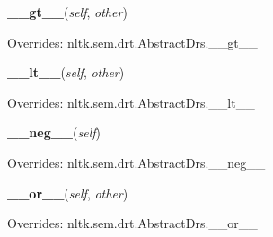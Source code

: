     \vspace{0.5ex}

\hspace{.8\funcindent}\begin{boxedminipage}{\funcwidth}

    \raggedright \textbf{\_\_gt\_\_}(\textit{self}, \textit{other})

\setlength{\parskip}{2ex}
\setlength{\parskip}{1ex}
      Overrides: nltk.sem.drt.AbstractDrs.\_\_gt\_\_

    \end{boxedminipage}

    \vspace{0.5ex}

\hspace{.8\funcindent}\begin{boxedminipage}{\funcwidth}

    \raggedright \textbf{\_\_lt\_\_}(\textit{self}, \textit{other})

\setlength{\parskip}{2ex}
\setlength{\parskip}{1ex}
      Overrides: nltk.sem.drt.AbstractDrs.\_\_lt\_\_

    \end{boxedminipage}

    \vspace{0.5ex}

\hspace{.8\funcindent}\begin{boxedminipage}{\funcwidth}

    \raggedright \textbf{\_\_neg\_\_}(\textit{self})

\setlength{\parskip}{2ex}
\setlength{\parskip}{1ex}
      Overrides: nltk.sem.drt.AbstractDrs.\_\_neg\_\_

    \end{boxedminipage}

    \vspace{0.5ex}

\hspace{.8\funcindent}\begin{boxedminipage}{\funcwidth}

    \raggedright \textbf{\_\_or\_\_}(\textit{self}, \textit{other})

\setlength{\parskip}{2ex}
\setlength{\parskip}{1ex}
      Overrides: nltk.sem.drt.AbstractDrs.\_\_or\_\_

    \end{boxedminipage}

    \vspace{0.5ex}

